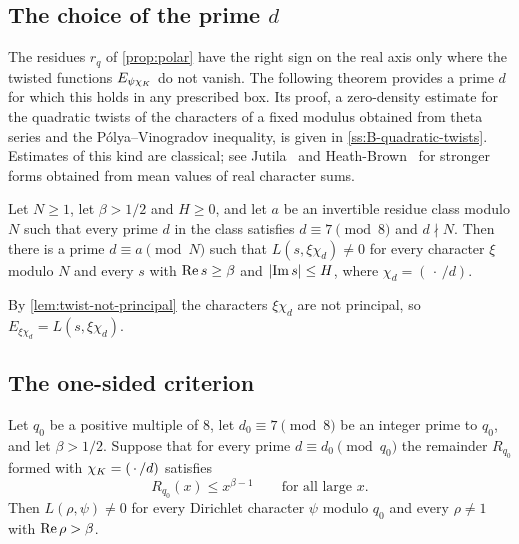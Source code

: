 \subsection{The choice of the prime \texorpdfstring{$d$}{d}}\label{ss:choice-d}
The residues $r_q$ of \cref{prop:polar} have the right sign on the real axis only where the twisted
functions $E_{\psi\chi_K}$ do not vanish. The following theorem provides a prime $d$ for which this
holds in any prescribed box. Its proof, a zero-density estimate for the quadratic twists of the
characters of a fixed modulus obtained from theta series and the P\'olya--Vinogradov inequality, is
given in \cref{ss:B-quadratic-twists}. Estimates of this kind are classical; see
Jutila~\cite{Jutila1975} and Heath-Brown~\cite{HeathBrown1995} for stronger forms obtained from mean
values of real character sums.

\begin{theorem}\label{thm:choice-of-d}
Let $N\ge1$, let $\beta>1/2$ and $H\ge0$, and let $a$ be an invertible residue class modulo $N$
such that every prime $d$ in the class satisfies $d\equiv7\pmod8$ and $d\nmid N$. Then there is a
prime $d\equiv a\pmod N$ such that $L(s,\xi\chi_d)\neq0$ for every character $\xi$ modulo $N$ and
every $s$ with $\operatorname{Re} s\ge\beta$ and $\lvert \operatorname{Im} s\rvert\le H$, where $\chi_d=(\,\cdot\,/d)$.
\end{theorem}

By \cref{lem:twist-not-principal} the characters $\xi\chi_d$ are not principal, so
$E_{\xi\chi_d}=L(s,\xi\chi_d)$.

\subsection{The one-sided criterion}\label{ss:criterion}

\begin{theorem}\label{thm:one-sided-criterion}
Let $q_0$ be a positive multiple of $8$, let $d_0\equiv7\pmod8$ be an integer prime to $q_0$, and let
$\beta>1/2$. Suppose that for every prime $d\equiv d_0\pmod{q_0}$ the remainder $R_{q_0}$ formed
with $\chi_K=(\,\cdot\,/d)$ satisfies
\[
  R_{q_0}(x)\le x^{\beta-1}\qquad\text{for all large } x.
\]
Then $L(\rho,\psi)\neq0$ for every Dirichlet character $\psi$ modulo $q_0$ and every $\rho\neq1$ with
$\operatorname{Re}\rho>\beta$.
\end{theorem}

